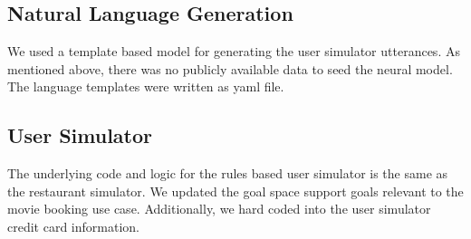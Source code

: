 \subsection{ Natural Language Generation}

We used a template based model for generating the user simulator utterances. As mentioned above, there was no publicly available data to seed the neural model. The language templates were written as yaml file.

\subsection{User Simulator}

The underlying code and logic for the rules based user simulator is the same as the restaurant simulator. We updated the goal space support goals relevant to the movie booking use case. Additionally, we hard coded into the user simulator credit card information.


